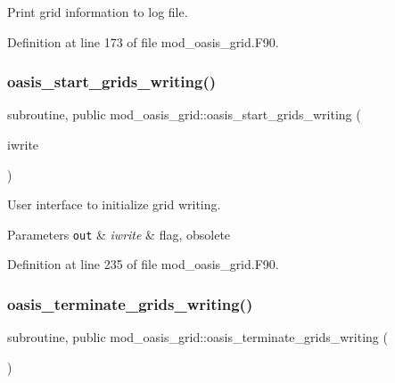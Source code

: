 Print grid information to log file. 



Definition at line 173 of file mod\+\_\+oasis\+\_\+grid.\+F90.

\mbox{\label{namespacemod__oasis__grid_acb0569d8677f0762559ed6b211945d9b}} 
\subsubsection{\texorpdfstring{oasis\+\_\+start\+\_\+grids\+\_\+writing()}{oasis\_start\_grids\_writing()}}
{\footnotesize\ttfamily subroutine, public mod\+\_\+oasis\+\_\+grid\+::oasis\+\_\+start\+\_\+grids\+\_\+writing (\begin{DoxyParamCaption}\item[{integer(kind=ip\+\_\+intwp\+\_\+p), intent(out)}]{iwrite }\end{DoxyParamCaption})}



User interface to initialize grid writing. 


\begin{DoxyParams}[1]{Parameters}
\mbox{\tt out}  & {\em iwrite} & flag, obsolete \\
\hline
\end{DoxyParams}


Definition at line 235 of file mod\+\_\+oasis\+\_\+grid.\+F90.

\mbox{\label{namespacemod__oasis__grid_a59755e271ccdd0c98807b5938ef33e78}} 
\subsubsection{\texorpdfstring{oasis\+\_\+terminate\+\_\+grids\+\_\+writing()}{oasis\_terminate\_grids\_writing()}}
{\footnotesize\ttfamily subroutine, public mod\+\_\+oasis\+\_\+grid\+::oasis\+\_\+terminate\+\_\+grids\+\_\+writing (\begin{DoxyParamCaption}{ }\end{DoxyParamCaption})}



